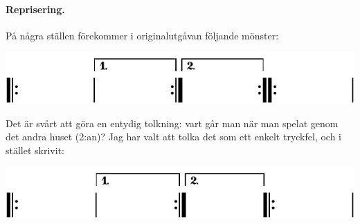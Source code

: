{\paragraph{Reprisering.} På några ställen förekommer i originalutgåvan följande mönster:

\vspace{3mm}
\includegraphics{include/snippets/repriser-fel-crop.pdf}
\vspace{3mm}

{
\setlength{\parindent}{0em}
Det är svårt att göra en entydig tolkning: vart går man när man spelat genom det
andra \guillemotright{}huset\guillemotright{} (2:an)? Jag har valt att tolka det som ett enkelt tryckfel, och
i stället skrivit:
}

\vspace{3mm}
\includegraphics{include/snippets/repriser-ratt-crop.pdf}

}
\restoregeometry
\fancyhfoffset[E,O]{0pt}
